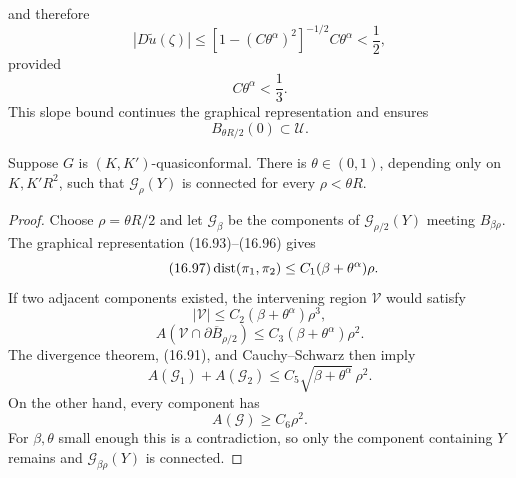and therefore
\begin{equation}
|D\widetilde u(\zeta)|
\le[1-(C\theta^\alpha)^2]^{-1/2}C\theta^\alpha<\frac12,
\tag{16.94}
\end{equation}
provided
\begin{equation}
C\theta^\alpha<\frac13.
\tag{16.95}
\end{equation}
This slope bound continues the graphical representation and ensures
\begin{equation}
B_{\theta R/2}(0)\subset\mathcal U.
\tag{16.96}
\end{equation}

\begin{lemma}\label{gilbarg-trudinger.lem.16.17.local-connectivity}
Suppose $G$ is $(K,K')$-quasiconformal. There is $\theta\in(0,1)$, depending only on $K,K'R^2$, such that $\mathscr G_\rho(Y)$ is connected for every $\rho<\theta R$.
\end{lemma}

\begin{proof}
\sketch Choose $\rho=\theta R/2$ and let $\mathcal G_\beta$ be the components of
$\mathscr G_{\rho/2}(Y)$ meeting $B_{\beta\rho}$. The graphical representation
(16.93)--(16.96) gives
\begin{equation}\tag{16.97}
\operatorname{dist}(\pi_1,\pi_2)\le C_1(\beta+\theta^\alpha)\rho.
\end{equation}
If two adjacent components existed, the intervening region $\mathcal V$ would satisfy
\[
|\mathcal V|\le C_2(\beta+\theta^\alpha)\rho^3,
\]
\begin{equation}\tag{16.98}
A(\mathcal V\cap\partial\overline B_{\rho/2})
\le C_3(\beta+\theta^\alpha)\rho^2.
\end{equation}
The divergence theorem, (16.91), and Cauchy--Schwarz then imply
\begin{equation}\tag{16.99}
A(\mathcal G_1)+A(\mathcal G_2)
\le C_5\sqrt{\beta+\theta^\alpha}\,\rho^2.
\end{equation}
On the other hand, every component has
\begin{equation}\tag{16.100}
A(\mathcal G)\ge C_6\rho^2.
\end{equation}
For $\beta,\theta$ small enough this is a contradiction, so only the component
containing $Y$ remains and $\mathscr G_{\beta\rho}(Y)$ is connected.
\end{proof}


